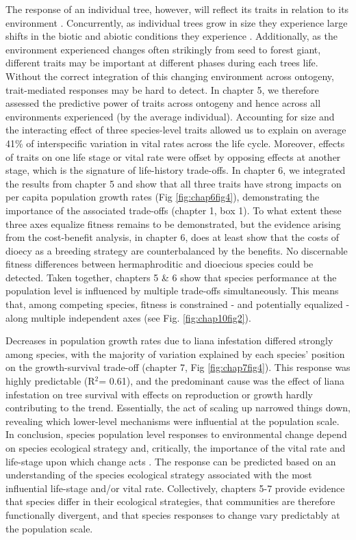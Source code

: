 \documentclass[b5paper,justified]{tufte-book} %
\begin{document}
\begin{fullwidth}
	The response of an individual tree, however, will reflect its traits in relation to its environment \citep[e.g.][]{Sterck2005}. Concurrently, as individual trees grow in size they experience large shifts in the biotic and abiotic conditions they experience \citep[e.g.][]{Poorter2005}. Additionally, as the environment experienced changes often strikingly from seed to forest giant, different traits may be important at different phases during each trees life. Without the correct integration of this changing environment across ontogeny, trait-mediated responses may be hard to detect. In chapter 5, we therefore assessed the predictive power of traits across ontogeny and hence across all environments experienced (by the average individual). Accounting for size and the interacting effect of three species-level traits allowed us to explain on average 41\% of interspecific variation in vital rates across the life cycle. Moreover, effects of traits on one life stage or vital rate were offset by opposing effects at another stage, which is the signature of life-history trade-offs. In chapter 6, we integrated the results from chapter 5 and show that all three traits have strong impacts on per capita population growth rates (Fig \ref{fig:chap6fig4}), demonstrating the importance of the associated trade-offs (chapter 1, box 1). To what extent these three axes equalize fitness remains to be demonstrated, but the evidence arising from the cost-benefit analysis, in chapter 6, does at least show that the costs of dioecy as a breeding strategy are counterbalanced by the benefits. No discernable fitness differences between hermaphroditic and dioecious species could be detected. Taken together, chapters 5 \& 6 show that species performance at the population level is influenced by multiple trade-offs simultaneously. This means that, among competing species, fitness is constrained - and potentially equalized - along multiple independent axes (see Fig. \ref{fig:chap10fig2}).
	 
Decreases in population growth rates due to liana infestation differed strongly among species, with the majority of variation explained by each species' position on the growth-survival trade-off (chapter 7, Fig \ref{fig:chap7fig4}).  This response was highly predictable (R$^2$= 0.61), and the predominant cause was the effect of liana infestation on tree survival with effects on reproduction or growth hardly contributing to the trend. Essentially, the act of scaling up narrowed things down, revealing which lower-level mechanisms were influential at the population scale.  In conclusion, species population level responses to environmental change depend on species ecological strategy and, critically, the importance of the vital rate and life-stage upon which change acts \citep{Zuidema2001}. The response can be predicted based on an understanding of the species ecological strategy associated with the most influential life-stage and/or vital rate. Collectively, chapters 5-7 provide evidence that species differ in their ecological strategies, that communities are therefore functionally divergent, and that species responses to change vary predictably at the population scale. 



\end{fullwidth}
\end{document}
